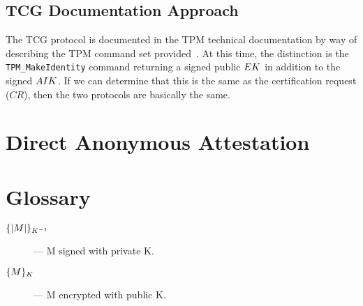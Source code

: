 \documentclass[10pt]{article}
\begin{document}
\subsection{TCG Documentation Approach}

The TCG protocol is documented in the TPM technical documentation by
way of describing the TPM command set
provided~\citep{---::TCG-TPM-Specifi}.  At this time, the distinction
is the \verb+TPM_MakeIdentity+ command returning a signed public
$EK$ in addition to the signed $AIK$.  If we can
determine that this is the same as the certification request ($CR$),
then the two protocols are basically the same.

\section{Direct Anonymous Attestation}

\nocite{---::TCG-TPM-Specifi,Ryan:09:Introduction-to}

\section{Glossary}

\begin{description}
\item[$\{|M|\}_{K^{-1}}$] --- M signed with private K.
\item[$\{M\}_{K}$]  --- M encrypted with public K.
\end{description}


\end{document}
